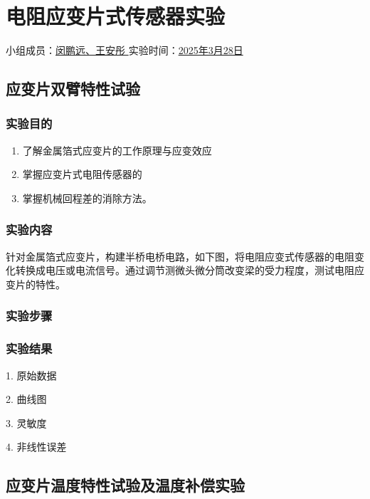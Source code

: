 \section{电阻应变片式传感器实验}

\begin{center}
    {
        小组成员：\underline{\quad 闵鹏远、王安彤 \quad} \quad
        实验时间：\underline{\quad 2025年3月28日 \quad}
    }
\end{center}

\subsection{应变片双臂特性试验}

\subsubsection{实验目的}

\begin{enumerate}
    \item 了解金属箔式应变片的工作原理与应变效应
    \item 掌握应变片式电阻传感器的
    \item 掌握机械回程差的消除方法。
\end{enumerate}

\subsubsection{实验内容}

针对金属箔式应变片，构建半桥电桥电路，如下图，将电阻应变式传感器的电阻变化转换成电压或电流信号。通过调节测微头微分筒改变梁的受力程度，测试电阻应变片的特性。

\subsubsection{实验步骤}

\subsubsection{实验结果}

1. 原始数据

2. 曲线图

3. 灵敏度

4. 非线性误差

\subsection{应变片温度特性试验及温度补偿实验}

